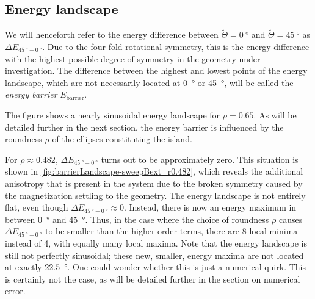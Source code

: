 \documentclass[11pt,a4paper,english,twoside]{article}
\begin{document}
\subsection{Energy landscape}
We will henceforth refer to the energy difference between $\widetilde{\Theta} = \SI{0}{\degree}$ and $\widetilde{\Theta} = \SI{45}{\degree}$ as $\Delta E_{\SI{45}{\degree}-\SI{0}{\degree}}$. Due to the four-fold rotational symmetry, this is the energy difference with the highest possible degree of symmetry in the geometry under investigation. The difference between the highest and lowest points of the energy landscape, which are not necessarily located at \SI{0}{\degree} or \SI{45}{\degree}, will be called the \textit{energy barrier} $E_\mathrm{barrier}$. \par
The figure shows a nearly sinusoidal energy landscape for $\rho=0.65$. As will be detailed further in the next section, the energy barrier is influenced by the roundness $\rho$ of the ellipses constituting the island. \par
For $\rho \approx 0.482$, $\Delta E_{\SI{45}{\degree}-\SI{0}{\degree}}$ turns out to be approximately zero. This situation is shown in \cref{fig:barrierLandscape-sweepBext_r0.482}, which reveals the additional anisotropy that is present in the system due to the broken symmetry caused by the magnetization settling to the geometry. The energy landscape is not entirely flat, even though $\Delta E_{\SI{45}{\degree}-\SI{0}{\degree}} \approx 0$. Instead, there is now an energy maximum in between \SI{0}{\degree} and \SI{45}{\degree}. Thus, in the case where the choice of roundness $\rho$ causes $\Delta E_{\SI{45}{\degree}-\SI{0}{\degree}}$ to be smaller than the higher-order terms, there are 8 local minima instead of 4, with equally many local maxima. Note that the energy landscape is still not perfectly sinusoidal; these new, smaller, energy maxima are not located at exactly \SI{22.5}{\degree}. One could wonder whether this is just a numerical quirk. This is certainly not the case, as will be detailed further in the section on numerical error.
\end{document}
